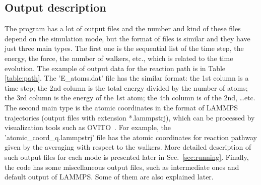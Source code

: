 \documentclass[preprint,12pt]{elsarticle}
\begin{document}
\subsection{Output description}
The program has a lot of output files and the number and kind of these files depend on the simulation mode, but the format of files is similar and they have just three main types. The first one is the sequential list of the time step, the energy, the force, the number of walkers, etc., which is related to the time evolution. The example of output data for the reaction path is in Table \ref{table:path}. The 'E\_atoms.dat' file has the similar format: the 1st column is a time step; the 2nd column is the total energy divided by the number of atoms; the 3rd column is the energy of the 1st atom; the 4th column is of the 2nd, \dots etc. The second main type is the atomic coordinates in the format of LAMMPS trajectories (output files with extension *.lammpstrj), which can be processed by visualization tools such as OVITO~\cite{Stukowski_2009,OVITO}. For example, the 'atomic\_coord\_q.lammpstrj' file has the atomic coordinates for reaction pathway given by the averaging with respect to the walkers. More detailed description of such output files for each mode is presented later in Sec.~\ref{sec:running}. Finally, the code has some miscellaneous output files, such as intermediate ones and default output of LAMMPS. Some of them are also explained later.
\end{document}
